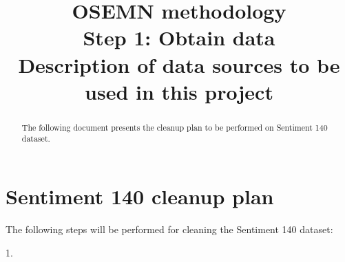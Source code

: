 \documentclass[11pt]{article}
\begin{document}
    \title{OSEMN methodology \\
    Step 1: Obtain data \\
    Description of data sources to be used in this project}

    \maketitle

    \begin{abstract}
        The following document presents the cleanup plan to be performed on Sentiment 140 dataset.
    \end{abstract}

    \section{Sentiment 140 cleanup plan} \label{sec:data_prep}

    The following steps will be performed for cleaning the Sentiment 140 dataset:

    1.
\end{document}
